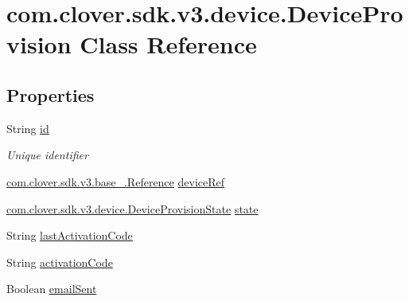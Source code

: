 \hypertarget{classcom_1_1clover_1_1sdk_1_1v3_1_1device_1_1_device_provision}{}\section{com.\+clover.\+sdk.\+v3.\+device.\+Device\+Provision Class Reference}
\label{classcom_1_1clover_1_1sdk_1_1v3_1_1device_1_1_device_provision}
\subsection*{Properties}
\begin{DoxyCompactItemize}
\item 
String \hyperlink{classcom_1_1clover_1_1sdk_1_1v3_1_1device_1_1_device_provision_abab796593b04ec6e752cd56294a61a12}{id}
\begin{DoxyCompactList}\small\item\em Unique identifier \end{DoxyCompactList}\item 
\hyperlink{classcom_1_1clover_1_1sdk_1_1v3_1_1base___1_1_reference}{com.\+clover.\+sdk.\+v3.\+base\+\_\+.\+Reference} \hyperlink{classcom_1_1clover_1_1sdk_1_1v3_1_1device_1_1_device_provision_a5ecc0d679d35acdfb450d82bb090e4a3}{device\+Ref}
\item 
\hyperlink{namespacecom_1_1clover_1_1sdk_1_1v3_1_1device_a91531b18ad063f2ee84a585d774b2d56}{com.\+clover.\+sdk.\+v3.\+device.\+Device\+Provision\+State} \hyperlink{classcom_1_1clover_1_1sdk_1_1v3_1_1device_1_1_device_provision_a5119d3d7c23e740cb4906ef3b3f24c83}{state}
\item 
String \hyperlink{classcom_1_1clover_1_1sdk_1_1v3_1_1device_1_1_device_provision_a2a700171bfa038bdf6ab1cc6f085442f}{last\+Activation\+Code}
\item 
String \hyperlink{classcom_1_1clover_1_1sdk_1_1v3_1_1device_1_1_device_provision_aee7be6ad901a7bccfea2567d6ca4120d}{activation\+Code}
\item 
Boolean \hyperlink{classcom_1_1clover_1_1sdk_1_1v3_1_1device_1_1_device_provision_ac13e0a56bae93a59f5ae9ab4f66d2c41}{email\+Sent}

\end{DoxyCompactItemize}
